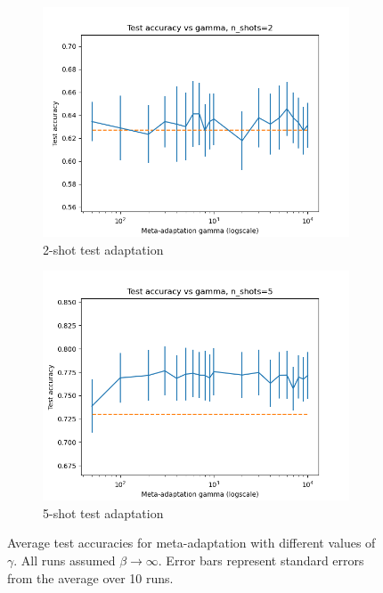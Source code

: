 \documentclass{article}
\theoremstyle{definition}
\begin{document}
\begin{figure}[h!]
	\centering
	\begin{subfigure}[b]{0.49\textwidth}
		\centering
		\includegraphics[width=\textwidth]{accuracy_plot_2}
		\caption{2-shot test adaptation}
	\end{subfigure}
	\hfill
	\begin{subfigure}[b]{0.49\textwidth}
		\centering
		\includegraphics[width=\textwidth]{accuracy_plot_5}
		\caption{5-shot test adaptation}	 	
	\end{subfigure}
	\hfill
	\caption{Average test accuracies for meta-adaptation with different values of $\gamma$. All runs assumed $\beta\rightarrow\infty$. Error bars represent standard errors from the average over 10 runs.}	 
	\label{fig:results-gamma}
\end{figure}
\end{document}
